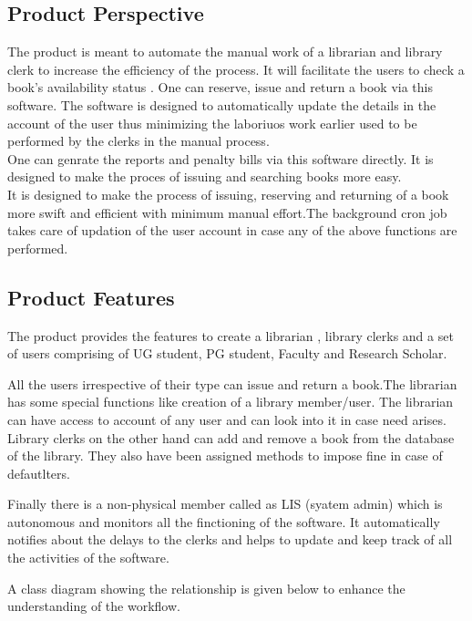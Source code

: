 \documentclass{article}
\begin{document}
\subsection{Product Perspective}
The product is meant to automate the manual work of a librarian and library clerk to increase the efficiency of the process. It will facilitate the users to check a book's availability status . One can reserve, issue and return a book via this software. The software is designed to automatically update the details in the account of the user thus minimizing the laboriuos work earlier used to be performed by the clerks in the manual process.
\\
One can genrate the reports and penalty bills via this software directly. It is designed to make the proces of issuing and searching books more easy.
\\
It is designed to make the process of issuing, reserving and returning of a book more swift and efficient with minimum manual effort.The background cron job takes care of updation of the user account in case any of the above functions are performed.

\subsection{Product Features}
The product provides the features to create a librarian , library clerks and a set of users comprising of UG student, PG student, Faculty and Research Scholar.

All the users irrespective of their type can issue and return a book.The librarian has some special functions like creation of a library member/user. The librarian can have access to account of any user and can look into it in case need arises.
Library clerks on the other hand can add and remove a book from the database of the library. They also have been assigned methods to impose fine in case of defautlters.

Finally there is a non-physical member called as LIS (syatem admin) which is autonomous and monitors all the finctioning of the software. It automatically notifies about the delays to the clerks and helps to update and keep track of all the activities of the software.

A class diagram showing the relationship is given below to enhance the understanding of the workflow.
\end{document}
